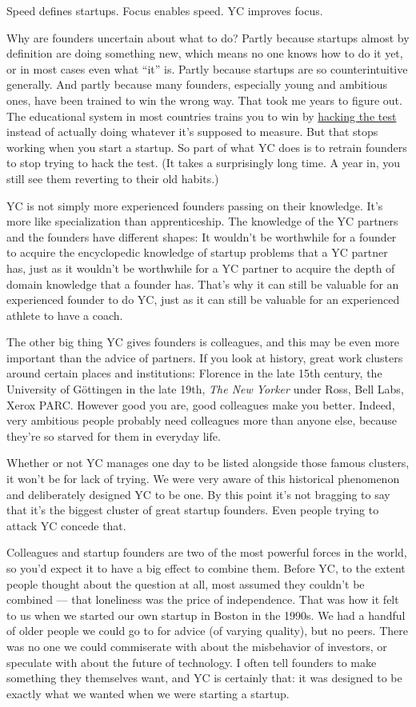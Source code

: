 Speed defines startups. Focus enables speed. YC improves focus.

Why are founders uncertain about what to do? Partly because startups
almost by definition are doing something new, which means no one knows
how to do it yet, or in most cases even what ``it'' is. Partly because
startups are so counterintuitive generally. And partly because many
founders, especially young and ambitious ones, have been trained to win
the wrong way. That took me years to figure out. The educational system
in most countries trains you to win by \href{lesson.html}{hacking the
test} instead of actually doing whatever it's supposed to measure. But
that stops working when you start a startup. So part of what YC does is
to retrain founders to stop trying to hack the test. (It takes a
surprisingly long time. A year in, you still see them reverting to their
old habits.)

YC is not simply more experienced founders passing on their knowledge.
It's more like specialization than apprenticeship. The knowledge of the
YC partners and the founders have different shapes: It wouldn't be
worthwhile for a founder to acquire the encyclopedic knowledge of
startup problems that a YC partner has, just as it wouldn't be
worthwhile for a YC partner to acquire the depth of domain knowledge
that a founder has. That's why it can still be valuable for an
experienced founder to do YC, just as it can still be valuable for an
experienced athlete to have a coach.

The other big thing YC gives founders is colleagues, and this may be
even more important than the advice of partners. If you look at history,
great work clusters around certain places and institutions: Florence in
the late 15th century, the University of Göttingen in the late 19th,
\emph{The New Yorker} under Ross, Bell Labs, Xerox PARC. However good
you are, good colleagues make you better. Indeed, very ambitious people
probably need colleagues more than anyone else, because they're so
starved for them in everyday life.

Whether or not YC manages one day to be listed alongside those famous
clusters, it won't be for lack of trying. We were very aware of this
historical phenomenon and deliberately designed YC to be one. By this
point it's not bragging to say that it's the biggest cluster of great
startup founders. Even people trying to attack YC concede that.

Colleagues and startup founders are two of the most powerful forces in
the world, so you'd expect it to have a big effect to combine them.
Before YC, to the extent people thought about the question at all, most
assumed they couldn't be combined --- that loneliness was the price of
independence. That was how it felt to us when we started our own startup
in Boston in the 1990s. We had a handful of older people we could go to
for advice (of varying quality), but no peers. There was no one we could
commiserate with about the misbehavior of investors, or speculate with
about the future of technology. I often tell founders to make something
they themselves want, and YC is certainly that: it was designed to be
exactly what we wanted when we were starting a startup.

